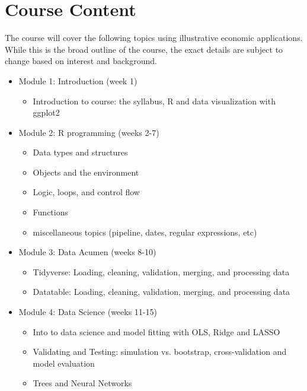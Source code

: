 \documentclass[11pt]{article}
\begin{document}
\section*{Course Content}
The course will cover the following topics using illustrative economic applications. While this is the broad outline of the course, the exact details are subject to change based on interest and background.


\begin{itemize}
	\item Module 1: Introduction (week 1)
	\begin{itemize}
    	\item Introduction to course: the syllabus, R and data visualization with ggplot2
	\end{itemize}
	
	\item Module 2: R programming (weeks 2-7)
	\begin{itemize}
    	\item Data types and structures
    	\item Objects and the environment
    	\item Logic, loops, and control flow
    	\item Functions
        \item miscellaneous topics (pipeline, dates, regular expressions, etc)
	\end{itemize} 
	
	\item Module 3: Data Acumen (weeks 8-10)
	\begin{itemize}
    	\item Tidyverse: Loading, cleaning, validation, merging, and processing data
    	\item Datatable: Loading, cleaning, validation, merging, and processing data
	\end{itemize}  
	
	\item Module 4: Data Science (weeks 11-15)
	\begin{itemize}
    	\item Into to data science and model fitting with OLS, Ridge and LASSO
    	\item Validating and Testing: simulation vs. bootstrap, cross-validation and model evaluation
    	\item Trees and Neural Networks
	\end{itemize}   
\end{itemize}
\end{document}

